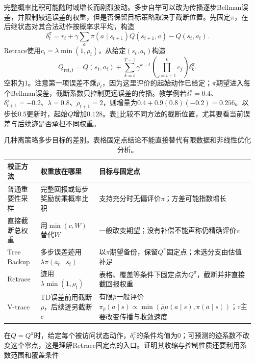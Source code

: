 完整概率比积可能随时域增长而剧烈波动。多步自举可以改为传播逐步Bellman误差，并限制较远误差的权重，但是否保留目标策略取决于截断位置。先固定$\pi$，在后继状态对其合法动作按概率求平均，构造
\[
  \delta_t^\pi=r_t+\gamma\sum_a\pi(a\mid s_{t+1})Q(s_{t+1},a)
                       -Q(s_t,a_t).
\]
Retrace使用$c_t=\lambda\min(1,\rho_t)$，从给定$(s_t,a_t)$构造
\begin{equation}
  Q_{\mathrm{ret},t}
   =Q(s_t,a_t)+\sum_{k=t}^{T-1}
        \gamma^{k-t}\left(\prod_{j=t+1}^{k}c_j\right)\delta_k^\pi .
  \label{eq:rl-learning-retrace}
\end{equation}
空积为1。注意第一项误差不乘$\rho_t$，因为这里评价的起始动作已给定；$\pi$期望进入每个Bellman误差，截断系数只控制更远误差的传播。教学例若$\delta_t^\pi=0.4$、$\delta_{t+1}^\pi=-0.2$、$\lambda=0.8$、$\rho_{t+1}=2$，则增量为$0.4+0.9(0.8)(-0.2)=0.256$。以步长$0.5$更新时，起始$Q$增加$0.128$。表\ref{tab:rl-learning-off-policy-targets}比较不同方法的截断位置，尤其要看当前误差与后续迹是否承担不同权重。

\begin{table}[t]
  \centering
  \small
  \begin{tabularx}{\linewidth}{>{\raggedright\arraybackslash}p{23mm} >{\raggedright\arraybackslash}X >{\raggedright\arraybackslash}X}
    \toprule
    校正方法 & 权重放在哪里 & 目标与固定点 \\
    \midrule
    普通重要性采样 & 完整回报或每步奖励前乘概率比积 & 支持充分时无偏评价$\pi$；方差可能指数增长 \\
    直接截断总权重 & 用$\min(c,W)$替代$W$ & 一般改变期望；没有补偿不能声称仍精确评价$\pi$ \\
    Tree Backup & 多步误差迹用$\lambda\pi(a_t\mid s_t)$ & 以$\pi$期望备份，保留$Q^\pi$固定点；未选分支由估值补足 \\
    Retrace & 迹用$\lambda\min(1,\rho_t)$ & 表格、覆盖等条件下固定点为$Q^\pi$，截断并非直接截回报权重 \\
    V-trace & TD误差前用截断$\rho$，后续迹另截断$c$ & 有限$\bar\rho$一般评价$\pi_{\bar\rho}(a\mid s)\propto\min(\bar\rho\mu(a\mid s),\pi(a\mid s))$；$c$主要改变传播与收敛速度 \\
    \bottomrule
  \end{tabularx}
  \caption{几种离策略多步目标的差别。表格固定点结论不能直接替代有限数据和非线性优化分析。}
  \label{tab:rl-learning-off-policy-targets}
\end{table}

在$Q=Q^\pi$时，给定每个被访问状态动作，$\delta_t^\pi$的条件均值为0；可预测的迹系数不改变这个零点，这是理解Retrace固定点的入口。证明其收缩与控制性质还要利用系数范围和覆盖条件

